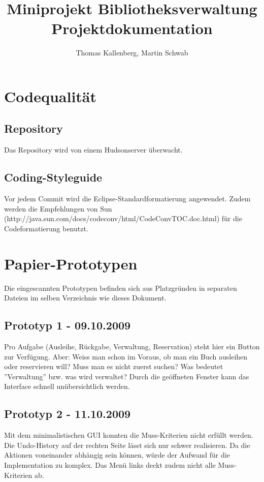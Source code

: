 \documentclass[10pt, a4paper]{scrartcl}
\title{Miniprojekt Bibliotheksverwaltung \\ \normalsize{Projektdokumentation}}
\author{Thomas Kallenberg, Martin Schwab}
\begin{document}
\maketitle
\section{Codequalität}
\subsection{Repository}
Das Repository wird von einem Hudsonserver überwacht.

\subsection{Coding-Styleguide}
Vor jedem Commit wird die Eclipse-Standardformatierung angewendet. Zudem werden die Empfehlungen von Sun (http://java.sun.com/docs/codeconv/html/CodeConvTOC.doc.html) für die Codeformatierung benutzt.

\section{Papier-Prototypen}
Die eingescannten Prototypen befinden sich aus Platzgründen in separaten Dateien im selben Verzeichnis wie dieses Dokument.

\subsection{Prototyp 1 - 09.10.2009} Pro Aufgabe (Ausleihe, Rückgabe, Verwaltung, Reservation) steht hier ein Button zur Verfügung. Aber: Weiss man schon im Voraus, ob man ein Buch ausleihen oder reservieren will? Muss man es nicht zuerst suchen? Was bedeutet ''Verwaltung'' bzw. was wird verwaltet? Durch die geöffneten Fenster kann das Interface schnell unübersichtlich werden.

\subsection{Prototyp 2 - 11.10.2009} Mit dem minimalistischen GUI konnten die Muss-Kriterien nicht erfüllt werden. Die Undo-History auf der rechten Seite lässt sich nur schwer realisieren. Da die Aktionen voneinander abhängig sein können, würde der Aufwand für die Implementation zu komplex. Das Menü links deckt zudem nicht alle Muss-Kriterien ab.
\end{document}
